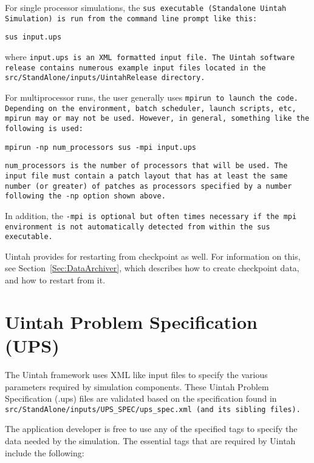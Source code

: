 For single processor simulations, the \tt sus \normalfont executable
(Standalone Uintah Simulation) is run from the command line prompt
like this:
\begin{Verbatim}[fontsize=\footnotesize]
  sus input.ups
\end{Verbatim}
where \tt input.ups \normalfont is an XML formatted input file.  The
Uintah software release contains numerous example input files located
in the \tt src/StandAlone/inputs/UintahRelease \normalfont directory.

For multiprocessor runs, the user generally uses \tt mpirun
\normalfont to launch the code.  Depending on the environment, batch
scheduler, launch scripts, etc, \tt mpirun \normalfont may or may not
be used.  However, in general, something like the following is used:
\begin{Verbatim}[fontsize=\footnotesize]
  mpirun -np num_processors sus -mpi input.ups
\end{Verbatim}

\tt num\_processors \normalfont is the number of processors that will
be used.  The input file must contain a patch layout that has at least
the same number (or greater) of patches as processors specified by a
number following the -np option shown above.

In addition, the \tt -mpi \normalfont is optional but often times
necessary if the mpi environment is not automatically detected from
within the sus executable.

Uintah provides for restarting from checkpoint as well.  For information on
this, see Section~\ref{Sec:DataArchiver}, which describes how to create
checkpoint data, and how to restart from it.

\section{Uintah Problem Specification (UPS)} \label{Sec:UPS}

The Uintah framework uses XML like input files to specify the various
parameters required by simulation components.  These Uintah Problem
Specification (.ups) files are validated based on the specification
found in \tt src/StandAlone/inputs/UPS\_SPEC/ups\_spec.xml \normalfont
(and its sibling files).

The application developer is free to use any of the specified tags to
specify the data needed by the simulation.  The essential tags that
are required by Uintah include the following:

